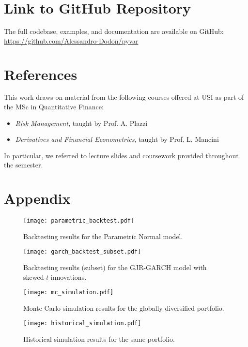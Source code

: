 \documentclass{article}
\begin{document}
\section{Link to GitHub Repository}

The full codebase, examples, and documentation are available on GitHub:  
\url{https://github.com/Alessandro-Dodon/pyvar}


\section{References}

This work draws on material from the following courses offered at USI as part of the MSc in Quantitative Finance:

\begin{itemize}
  \item \textit{Risk Management}, taught by Prof. A. Plazzi
  \item \textit{Derivatives and Financial Econometrics}, taught by Prof. L. Mancini
\end{itemize}

In particular, we referred to lecture slides and coursework provided throughout the semester.


\section{Appendix}

\begin{figure}[H]
    \centering
    \begin{minipage}{0.95\textwidth}
        \centering
        \texttt{[image: parametric\_backtest.pdf]}
        \caption{Backtesting results for the Parametric Normal model.}
    \end{minipage}
\end{figure}

\begin{figure}[H]
    \centering
    \begin{minipage}{0.95\textwidth}
        \centering
        \texttt{[image: garch\_backtest\_subset.pdf]}
        \caption{Backtesting results (subset) for the GJR-GARCH model with skewed-$t$ innovations.}
    \end{minipage}
\end{figure}

\begin{figure}[H]
    \centering
    \begin{minipage}{0.95\textwidth}
        \centering
        \texttt{[image: mc\_simulation.pdf]}
        \caption{Monte Carlo simulation results for the globally diversified portfolio.}
    \end{minipage}
\end{figure}

\begin{figure}[H]
    \centering
    \begin{minipage}{0.95\textwidth}
        \centering
        \texttt{[image: historical\_simulation.pdf]}
        \caption{Historical simulation results for the same portfolio.}
    \end{minipage}
\end{figure}
\end{document}
